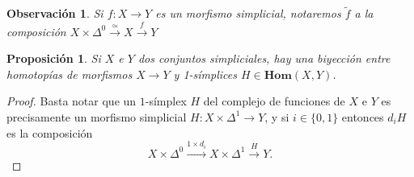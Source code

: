 \documentclass[11pt]{report}
\theoremstyle{colored}
\newtheorem{proposition}{Proposición}[section]
\newtheorem{remark}{Observación}[section]
\renewcommand{\ss}[1]{\Delta^{#1}}
\newcommand{\homcomplex}{\mathbf{Hom}}
\begin{document}
\begin{remark} Si $f : X \to Y$ es un morfismo simplicial, notaremos $\widetilde{f}$ a la composición $X \times \ss{0} \xrightarrow{\simeq} X \xrightarrow{f} Y$
\end{remark}

\begin{proposition} Si $X$ e $Y$ dos conjuntos simpliciales, hay una biyección entre homotopías de morfismos $X \to Y$ y 1-símplices $H \in \homcomplex(X,Y)$.
\end{proposition}
\begin{proof} Basta notar que un $1$-símplex $H$ del complejo de funciones de $X$ e $Y$ es precisamente un morfismo simplicial $H : X \times \ss{1} \to Y$, y si $i \in \{0,1\}$ entonces $d_iH$ es la composición
\[
X \times \ss{0} \xrightarrow{1 \times d_i} X \times \ss{1} \xrightarrow{H} Y.
\] 
\end{proof}
\end{document}

